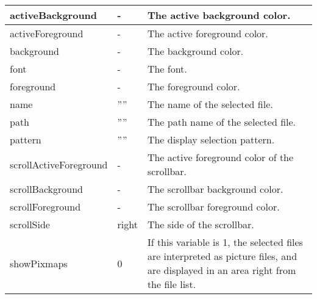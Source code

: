 {\newpage
\clearpage
\samepage \begin{supertabular}{|l|l|p{5.5cm}|}
activeBackground       & -       & The active background
                                   color. \\  \hline
activeForeground       & -       & The active foreground
                                   color. \\  \hline
background             & -       & The background color. \\  \hline
font                   & -       & The font. \\  \hline
foreground             & -       & The foreground color. \\  \hline
name                   & ''''    & The name of the selected
                                   file. \\  \hline
path                   & ''''    & The path name of the
                                   selected file. \\  \hline
pattern                & ''''    & The display selection
                                   pattern. \\  \hline
scrollActiveForeground & -       & The active foreground
                                   color of the scrollbar.\\  \hline
scrollBackground       & -       & The scrollbar background
                                   color. \\  \hline
scrollForeground       & -       & The scrollbar foreground
                                   color. \\  \hline
scrollSide             & right   & The side of the
                                   scrollbar. \\  \hline
showPixmaps            & 0       & If this variable is 1,
                                   the selected files are
                                   interpreted as picture
                                   files, and are displayed
                                   in an area right from the
                                   file list. \\  \hline
\end{supertabular}
}

{\newpage
\clearpage
\samepage \begin{figure}[ht]
  \centerline{
  \epsfysize=8cm
  }

  \label{fig:FSBox}
\end{figure}
}

